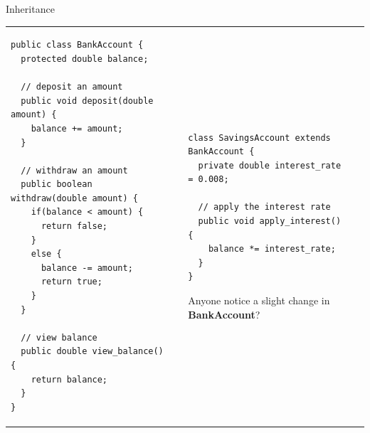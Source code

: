 \documentclass[aspectratio=169]{beamer}
\makeatletter
\newenvironment{splitslide}
{
\centering
\begin{tabular}{@{}m{0.50\textwidth} | m{0.025\textwidth}@{} m{0.4\textwidth}@{} m{0pt}@{}}
}
{
\end{tabular}
}
\makeatother
\begin{document}
\begin{frame}[fragile]{Inheritance}
\begin{splitslide}

\begin{Verbatim}[fontsize=\tiny]
public class BankAccount {
  protected double balance;
  
  // deposit an amount
  public void deposit(double amount) {
    balance += amount;
  }
  
  // withdraw an amount
  public boolean withdraw(double amount) {
    if(balance < amount) {
      return false;
    }
    else {
      balance -= amount;
      return true;
    }
  }
  
  // view balance
  public double view_balance() {
    return balance;  
  }
}
\end{Verbatim}

&&

\begin{Verbatim}[fontsize=\tiny]
class SavingsAccount extends BankAccount {
  private double interest_rate = 0.008;
  
  // apply the interest rate
  public void apply_interest() {
    balance *= interest_rate;
  }
}
\end{Verbatim}

\vspace{2em}
\raggedright
Anyone notice a slight change in \textbf{BankAccount}?

\end{splitslide}
\end{frame}
\end{document}
